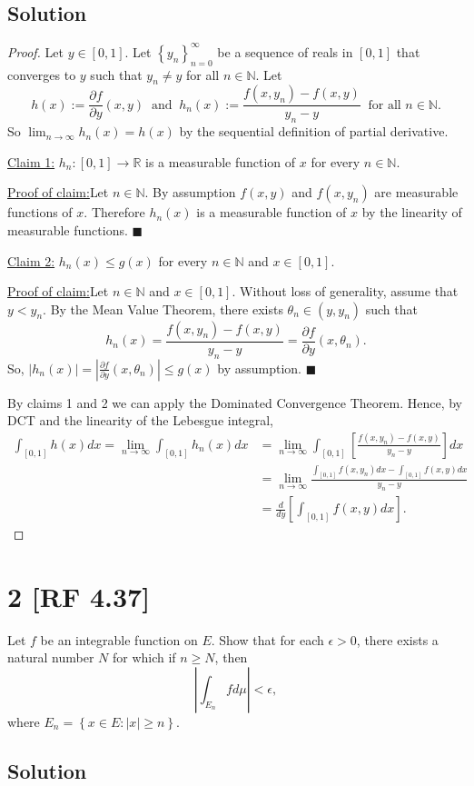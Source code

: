 \documentclass[12pt]{article}
\newenvironment{claimproof}[1]{\par\noindent\underline{Proof of claim:}\space#1}{\hfill $\blacksquare$\vspace{5mm}}
\begin{document}
\subsection*{Solution}
\begin{proof}
Let $y \in [0,1]$. Let $\left\{ y_{n} \right\}_{n=0}^{\infty}$ be a sequence of reals in $[0,1]$ that converges to $y$ such that $y_{n} \neq y$ for
all $n \in \mathbb{N}$. Let 
\[ h(x) := \frac{\partial f}{\partial y}(x,y) \ \text{ and }\ h_{n}(x):= \frac{f(x,y_{n}) - f(x,y)}{y_{n} - y} \ \text{ for all }n \in \mathbb{N}. \]
So $\lim_{n\rightarrow \infty}h_{n}(x) = h(x)$ by the sequential definition of partial derivative. 

\underline{Claim 1:} $h_{n} : [0,1] \rightarrow \mathbb{R}$ is a measurable function of $x$ for every $n \in \mathbb{N}$.
\begin{claimproof}
Let $n \in \mathbb{N}$. By assumption $f(x,y)$ and $f(x,y_{n})$ are measurable functions of $x$. Therefore $h_{n}(x)$ is a measurable function of $x$ 
by the linearity of measurable functions.
\end{claimproof}

\underline{Claim 2:} $h_{n}(x) \leq g(x)$ for every $n \in \mathbb{N}$ and $x \in [0,1]$.
\begin{claimproof}
Let $n \in \mathbb{N}$ and $x \in [0,1]$. Without loss of generality, assume that $y < y_{n}$. By the Mean Value Theorem, there exists $\theta_{n} \in (y, y_{n})$ such that 
\[ h_{n}(x) = \frac{f(x,y_{n}) - f(x,y)}{y_{n} - y} = \frac{\partial f}{\partial y}(x,\theta_{n}). \]
So, $|h_{n}(x)| = \left| \frac{\partial f}{\partial y}(x,\theta_{n})\right| \leq g(x)$ by assumption.
\end{claimproof}

By claims 1 and 2 we can apply the Dominated Convergence Theorem. Hence, by DCT and the linearity of the Lebesgue integral,
\begin{align*}
\int_{[0,1]}h(x)dx = \lim_{n\rightarrow\infty}\int_{[0,1]}h_{n}(x)dx & = \lim_{n\rightarrow\infty}\int_{[0,1]}\left[ \frac{f(x,y_{n}) - f(x,y)}{y_{n}-y} \right]dx \\
& = \lim_{n\rightarrow\infty} \frac{ \int_{[0,1]}f(x,y_{n})dx - \int_{[0,1]}f(x,y)dx}{y_{n} - y} \\
& = \frac{d}{dy}\left[ \int_{[0,1]}f(x,y)dx \right].
\end{align*}
\end{proof}




\newpage
\section*{2 [RF 4.37]}
Let $f$ be an integrable function on $E$. Show that for each $\epsilon > 0$, there exists a natural number $N$ for which if $n \geq N$, then 
\[ \left| \int_{E_{n}}fd\mu \right| < \epsilon, \]
where $E_{n} = \left\{ x \in E : |x| \geq n \right\}$.

\subsection*{Solution}
\end{document}
